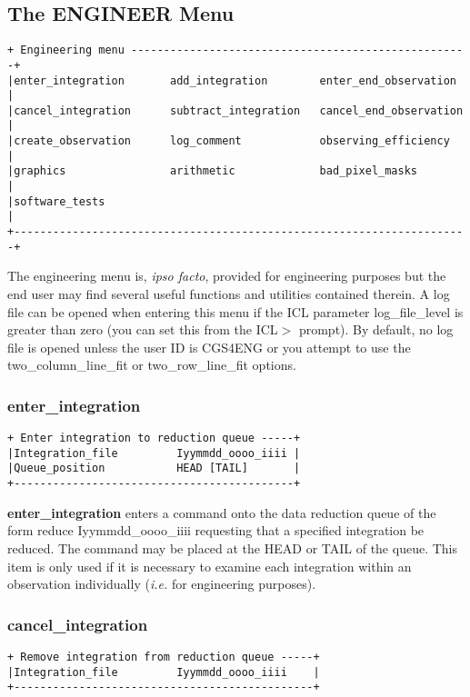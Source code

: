 {\subsection{The ENGINEER Menu}
\label{the_engineer_menu}
\begin{verbatim}
+ Engineering menu ----------------------------------------------------+
|enter_integration       add_integration        enter_end_observation  |
|cancel_integration      subtract_integration   cancel_end_observation |
|create_observation      log_comment            observing_efficiency   |
|graphics                arithmetic             bad_pixel_masks        |
|software_tests                                                        |
+----------------------------------------------------------------------+
\end{verbatim}

The engineering menu is, {\em ipso facto}, provided for engineering 
purposes but the end user may find several useful functions and utilities
contained therein. A log file can be opened when entering this menu if the 
ICL parameter {\sf log\_file\_level} is greater than zero (you can set this
from the {\sf ICL$>$} prompt). By default, no log file is opened unless 
the user ID is CGS4ENG or you attempt to use the {\sf two\_column\_line\_fit}
or {\sf two\_row\_line\_fit} options.

\subsubsection{enter\_integration}
\label{enter_integration}
\begin{verbatim}
+ Enter integration to reduction queue -----+
|Integration_file         Iyymmdd_oooo_iiii |
|Queue_position           HEAD [TAIL]       |
+-------------------------------------------+
\end{verbatim}

{\bf enter\_integration} enters a command onto the data reduction queue
of the form {\sf reduce Iyymmdd\_oooo\_iiii} requesting that a specified 
integration be reduced. The command may be placed at the {\sf HEAD} or
{\sf TAIL} of the queue. This item is only used if it is necessary to examine 
each integration within an observation individually ({\em i.e.} 
for engineering purposes).

\subsubsection{cancel\_integration}
\label{cancel_integration}
\begin{verbatim}
+ Remove integration from reduction queue -----+
|Integration_file         Iyymmdd_oooo_iiii    |
+----------------------------------------------+
\end{verbatim}

}

